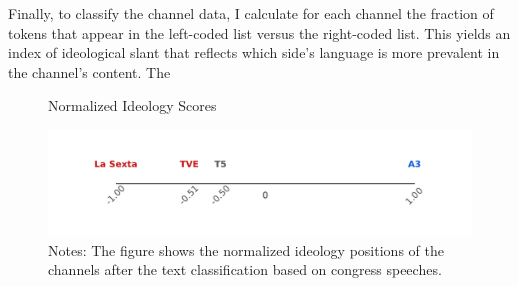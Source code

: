 \documentclass[12pt]{article}
\begin{document}
	
	
	
	
	Finally, to classify the channel data, I calculate for each channel the fraction of tokens that appear in the left-coded list versus the right-coded list. This yields an index of ideological slant that reflects which side's language is more prevalent in the channel’s content. The 
	
	
	
	\begin{figure}[H]
		\centering
		\caption{Normalized Ideology Scores}
		\includegraphics[width=120mm]{figures/congress_line}
		\caption*{\small Notes: The figure shows the normalized ideology positions of the channels after the text classification based on congress speeches. }
		\label{fig:congress_line}
	\end{figure}
	

	
	
\end{document}
